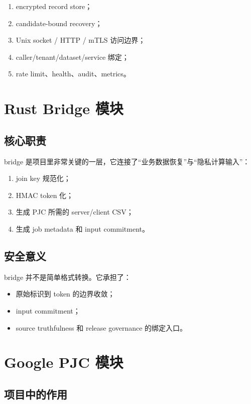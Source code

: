 \documentclass[UTF8,a4paper,12pt,oneside]{ctexrep}
\begin{document}
\begin{enumerate}
  \item encrypted record store；
  \item candidate-bound recovery；
  \item Unix socket / HTTP / mTLS 访问边界；
  \item caller/tenant/dataset/service 绑定；
  \item rate limit、health、audit、metrics。
\end{enumerate}

\section{Rust Bridge 模块}

\subsection{核心职责}

bridge 是项目里非常关键的一层，它连接了“业务数据恢复”与“隐私计算输入”：

\begin{enumerate}
  \item join key 规范化；
  \item HMAC token 化；
  \item 生成 PJC 所需的 server/client CSV；
  \item 生成 job metadata 和 input commitment。
\end{enumerate}

\subsection{安全意义}

bridge 并不是简单格式转换。它承担了：

\begin{itemize}
  \item 原始标识到 token 的边界收敛；
  \item input commitment；
  \item source truthfulness 和 release governance 的绑定入口。
\end{itemize}

\section{Google PJC 模块}

\subsection{项目中的作用}
\end{document}
